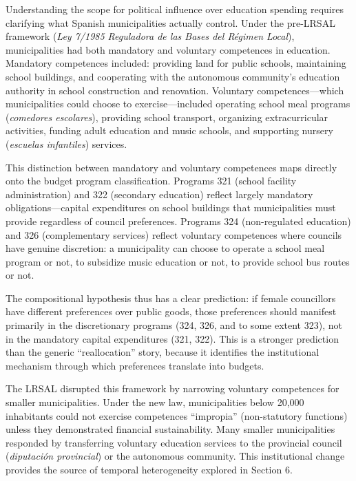 \documentclass[12pt]{article}
\begin{document}
Understanding the scope for political influence over education spending requires clarifying what Spanish municipalities actually control. Under the pre-LRSAL framework (\emph{Ley 7/1985 Reguladora de las Bases del R\'{e}gimen Local}), municipalities had both mandatory and voluntary competences in education. Mandatory competences included: providing land for public schools, maintaining school buildings, and cooperating with the autonomous community's education authority in school construction and renovation. Voluntary competences---which municipalities could choose to exercise---included operating school meal programs (\emph{comedores escolares}), providing school transport, organizing extracurricular activities, funding adult education and music schools, and supporting nursery (\emph{escuelas infantiles}) services.

This distinction between mandatory and voluntary competences maps directly onto the budget program classification. Programs 321 (school facility administration) and 322 (secondary education) reflect largely mandatory obligations---capital expenditures on school buildings that municipalities must provide regardless of council preferences. Programs 324 (non-regulated education) and 326 (complementary services) reflect voluntary competences where councils have genuine discretion: a municipality can choose to operate a school meal program or not, to subsidize music education or not, to provide school bus routes or not.

The compositional hypothesis thus has a clear prediction: if female councillors have different preferences over public goods, those preferences should manifest primarily in the discretionary programs (324, 326, and to some extent 323), not in the mandatory capital expenditures (321, 322). This is a stronger prediction than the generic ``reallocation'' story, because it identifies the institutional mechanism through which preferences translate into budgets.

The LRSAL disrupted this framework by narrowing voluntary competences for smaller municipalities. Under the new law, municipalities below 20,000 inhabitants could not exercise competences ``impropia'' (non-statutory functions) unless they demonstrated financial sustainability. Many smaller municipalities responded by transferring voluntary education services to the provincial council (\emph{diputaci\'{o}n provincial}) or the autonomous community. This institutional change provides the source of temporal heterogeneity explored in Section 6.
\end{document}
